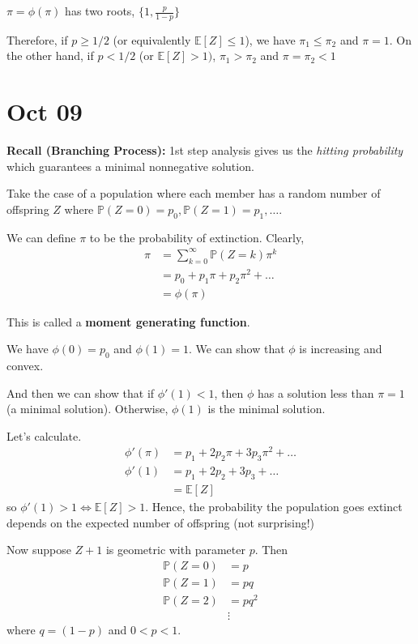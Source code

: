 \documentclass[12pt]{report}
\renewcommand{\P}{\mathbb{P}}
\newcommand{\E}{\mathbb{E}}
\begin{document}
    $\pi = \phi(\pi)$ has two roots, $\{1, \frac{p}{1 - p}\}$ 

    Therefore, if $p \geq 1/2$ (or equivalently $\E[Z]\leq 1$), we have $\pi_1 \leq \pi_2$ and $\pi = 1$. On the other hand, if $p < 1/2$ (or $\E[Z] > 1)$, $\pi_1 > \pi_2$ and $\pi = \pi_2 < 1$

\section{Oct 09}
    \textbf{Recall (Branching Process):} 1st step analysis gives us the \emph{hitting probability} which guarantees a minimal nonnegative solution. 

    Take the case of a population where each member has a random number of offspring $Z$ where $\P(Z = 0) = p_0, \P(Z = 1) = p_1, \dots$. 

    We can define $\pi$ to be the probability of extinction. Clearly, 
    \begin{align*}
        \pi &= \sum_{k=0}^\infty \P(Z = k)\pi^k\\ 
            &= p_0 + p_1\pi + p_2\pi^2 + \dots\\ 
            &= \phi(\pi)
    \end{align*}

    This is called a \textbf{moment generating function}. 
    
    We have $\phi(0) = p_0$ and $\phi(1) = 1$. We can show that $\phi$ is increasing and convex.

    And then we can show that if $\phi'(1) < 1$, then $\phi$ has a solution less than $\pi = 1$ (a minimal solution). Otherwise, $\phi(1)$ is the minimal solution.

    Let's calculate. 
    \begin{align*}
        \phi'(\pi) &= p_1 + 2p_2 \pi + 3p_3\pi^2 + \dots\\
        \phi'(1) &= p_1 + 2p_2 + 3p_3 + \dots\\ 
            &= \E[Z]
    \end{align*}
    so 
    $\phi'(1) > 1 \iff \E[Z] > 1$. Hence, the probability the population goes extinct depends on the expected number of offspring (not surprising!)

    Now suppose $Z + 1$ is geometric with parameter $p$. Then
    \begin{align*}
        \P(Z = 0) &= p\\ 
        \P(Z = 1) &= pq\\ 
        \P(Z = 2) &= pq^2\\
        &\vdots
    \end{align*}
    where $q = (1 - p)$ and $0 < p < 1$. 
\end{document}
